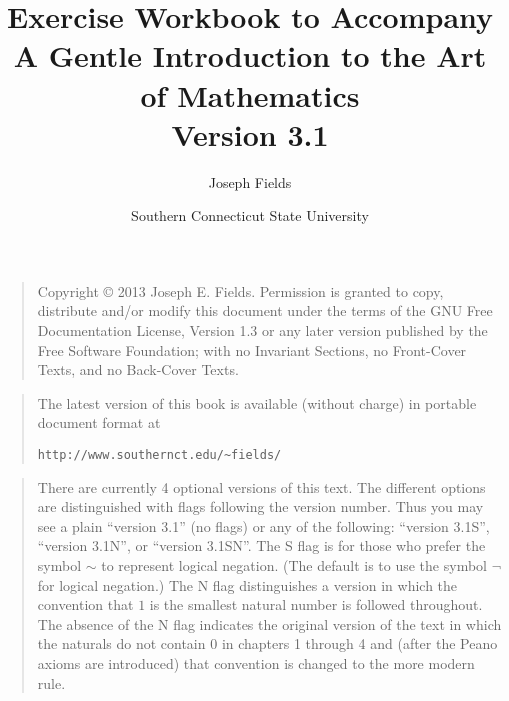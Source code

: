 \documentclass[dvips,12pt,twoside]{book}
\let\savedlnot\lnot
\begin{document}
\frontmatter

\title{Exercise Workbook to Accompany \\
A Gentle Introduction to the Art of Mathematics\\ {\small Version 3.1
 }}
\author{Joseph Fields}
\date{Southern Connecticut State University}

\maketitle

\clearpage

\rule{0pt}{0pt}

\vfill

\begin{quote}
    Copyright \copyright{}  2013  Joseph E. Fields.
    Permission is granted to copy, distribute and/or modify this document
    under the terms of the GNU Free Documentation License, Version 1.3
    or any later version published by the Free Software Foundation;
    with no Invariant Sections, no Front-Cover Texts, and no Back-Cover Texts.
\end{quote}

\vfill

\begin{quote}
The latest version of this book is available (without charge) in portable document format at \newline
\rule{0pt}{0pt} \hspace{1in} \verb+http://www.southernct.edu/~fields/+
\end{quote}

\vfill

\begin{quote}
There are currently 4 optional versions of this text.  The different options are distinguished with
flags following the version number.  Thus you may see a plain ``version  3.1'' (no flags) 
or any of the following: ``version 3.1S'', ``version 3.1N'',  or ``version 3.1SN''. 
The S flag is for those who prefer the symbol $\sim$ to represent 
logical negation.  (The default is to
use the symbol $\savedlnot$ for logical negation.)  The N flag distinguishes a version in which
the convention that $1$ is the smallest natural number is followed throughout.  The absence
of the N flag indicates the original version of the text in which the naturals do not contain $0$
in chapters 1 through 4 and (after the Peano axioms are introduced) that convention is changed
to the more modern rule. 

\end{quote}

\vfill

\clearpage

\mainmatter










\end{document}
